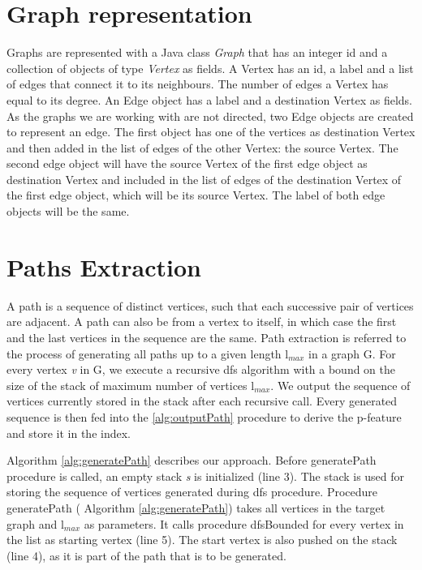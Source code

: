 \documentclass{l4proj}
\begin{document}
\section{Graph representation}
\label{sec:graph-representation}
Graphs are  represented with a Java class \emph{Graph} that has an integer id and a collection of objects of type \emph{Vertex} as fields. A Vertex has an id, a label and a list of edges that connect it to its neighbours. The number of edges a Vertex has equal to its degree. An Edge object has a label and a destination Vertex as fields. As the graphs we are working with are not directed, two Edge objects are created to represent an edge. The first object has one of the vertices as destination Vertex and then added in the list of edges of the other Vertex: the source Vertex. The second edge object will have the source Vertex of the first edge object as destination Vertex and included in the list of edges of the destination Vertex of the first edge object, which will be its source Vertex. The label of both edge objects will be the same.

\section{Paths Extraction}
\label{sec:pathsExtraction}
A path is a sequence of distinct vertices, such that each successive pair of vertices are adjacent. A path can also be from a vertex to itself, in which case the first and the last vertices in the sequence are the same. Path extraction is referred to the process of generating all paths up to a given length l$_{max}$ in a graph G. For every vertex \emph{v} in G, we execute a recursive \gls{dfs} algorithm with a bound on the size of the stack of maximum number of vertices l$_{max}$. We output the sequence of vertices currently stored in the stack after each recursive call. Every generated sequence is then fed into the \ref{alg:outputPath} procedure to derive the p-feature and store it in the index.

Algorithm \ref{alg:generatePath} describes our approach. Before generatePath procedure is called, an empty stack \emph{s} is initialized (line 3). The stack is used for storing the sequence of vertices generated during \gls{dfs} procedure. Procedure generatePath ( \textrm{Algorithm \ref{alg:generatePath}}) takes all vertices in the target graph and l$_{max}$ as parameters. It calls procedure dfsBounded for every vertex in the list as starting vertex (line 5). The start vertex is also pushed on the stack (line 4), as it is part of the path that is to be generated.
\end{document}
